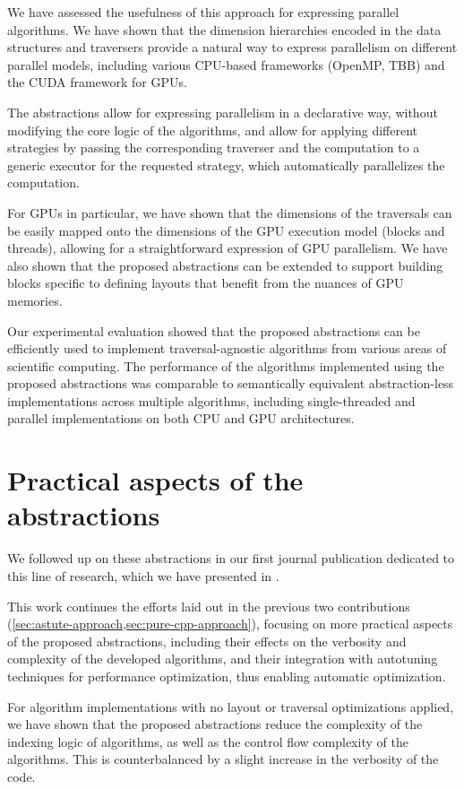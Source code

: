 We have assessed the usefulness of this approach for expressing parallel algorithms. We have shown that the dimension hierarchies encoded in the data structures and traversers provide a natural way to express parallelism on different parallel models, including various CPU-based frameworks (OpenMP, TBB) and the CUDA framework for GPUs.

The abstractions allow for expressing parallelism in a declarative way, without modifying the core logic of the algorithms, and allow for applying different strategies by passing the corresponding traverser and the computation to a generic executor for the requested strategy, which automatically parallelizes the computation.

For GPUs in particular, we have shown that the dimensions of the traversals can be easily mapped onto the dimensions of the GPU execution model (blocks and threads), allowing for a straightforward expression of GPU parallelism. We have also shown that the proposed abstractions can be extended to support building blocks specific to defining layouts that benefit from the nuances of GPU memories.

Our experimental evaluation showed that the proposed abstractions can be efficiently used to implement traversal-agnostic algorithms from various areas of scientific computing.
The performance of the algorithms implemented using the proposed abstractions was comparable to semantically equivalent abstraction-less implementations across multiple algorithms, including single-threaded and parallel implementations on both CPU and GPU architectures.


\section{Practical aspects of the abstractions}\label{sec:cpp-abstractions}

We followed up on these abstractions in our first journal publication dedicated to this line of research, which we have presented in .

This work continues the efforts laid out in the previous two contributions (\cref{sec:astute-approach,sec:pure-cpp-approach}), focusing on more practical aspects of the proposed abstractions, including their effects on the verbosity and complexity of the developed algorithms, and their integration with autotuning techniques for performance optimization, thus enabling automatic optimization.

For algorithm implementations with no layout or traversal optimizations applied, we have shown that the proposed abstractions reduce the complexity of the indexing logic of algorithms, as well as the control flow complexity of the algorithms. This is counterbalanced by a slight increase in the verbosity of the code.


